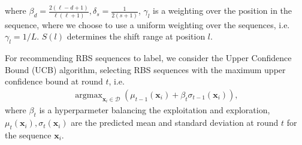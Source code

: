 where $\beta_d = \frac{2(\ell - d + 1)}{\ell(\ell+1)}, \delta_s = \frac{1}{2(s+1)}$, $\gamma_l$ is a weighting over the position in the
sequence, where we choose to use a uniform weighting over the sequences, i.e. $\gamma_l = 1/L$. $S(l)$ determines the shift
range at position $l$. 
    
    

For recommending RBS sequences to label, we consider the Upper Confidence Bound (UCB) algorithm, 
selecting RBS sequences with the maximum upper confidence bound at round $t$, i.e.
\begin{align}
\label{Eq: GPUCB}
    \operatorname{argmax}_{\mathbf{x}_i \in \mathcal{D}} \left( \mu_{t-1}(\mathbf{x}_i) + \beta_t \sigma_{t-1}(\mathbf{x}_i)\right),
\end{align}
where $\beta_t$ is a hyperparmeter balancing the exploitation and exploration, 
$\mu_t(\mathbf{x}_i), \sigma_t(\mathbf{x}_i)$ are the predicted mean and standard deviation at round $t$ for the sequence $\mathbf{x}_i$.


